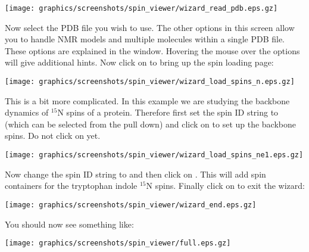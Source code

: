 \begin{minipage}[h]{\linewidth}
\centerline{\texttt{[image: graphics/screenshots/spin\_viewer/wizard\_read\_pdb.eps.gz]}}
\end{minipage}

Now select the PDB file you wish to use.  The other options in this screen allow you to handle NMR models and multiple molecules within a single PDB file.  These options are explained in the window.  Hovering the mouse over the options will give additional hints.  Now click on  to bring up the spin loading page:

\begin{minipage}[h]{\linewidth}
\centerline{\texttt{[image: graphics/screenshots/spin\_viewer/wizard\_load\_spins\_n.eps.gz]}}
\end{minipage}

This is a bit more complicated.  In this example we are studying the backbone dynamics of $^{15}$N spins of a protein.  Therefore first set the spin ID string to  (which can be selected from the pull down) and click on  to set up the backbone spins.  Do not click on  yet.


\begin{minipage}[h]{\linewidth}
\centerline{\texttt{[image: graphics/screenshots/spin\_viewer/wizard\_load\_spins\_ne1.eps.gz]}}
\end{minipage}

Now change the spin ID string to  and then click on .  This will add spin containers for the tryptophan indole $^{15}$N spins.  Finally click on  to exit the wizard:

\begin{minipage}[h]{\linewidth}
\centerline{\texttt{[image: graphics/screenshots/spin\_viewer/wizard\_end.eps.gz]}}
\label{figure: spin viewer end}
\end{minipage}

You should now see something like:

\begin{minipage}[h]{\linewidth}
\centerline{\texttt{[image: graphics/screenshots/spin\_viewer/full.eps.gz]}}
\end{minipage}



